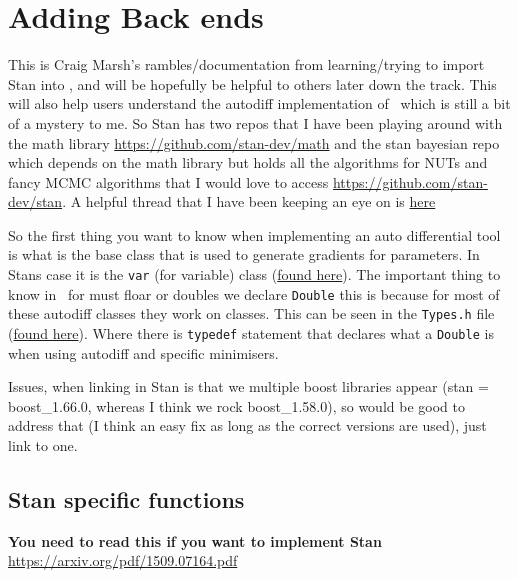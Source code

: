 \section{Adding Back ends\label{sec:Introduction}}
This is Craig Marsh's rambles/documentation from learning/trying to import Stan into \CNAME, and will be hopefully be helpful to others later down the track. This will also help users understand the autodiff implementation of \CNAME\ which is still a bit of a mystery to me. So Stan has two repos that I have been playing around with the math library \url{https://github.com/stan-dev/math} and the stan bayesian repo which depends on the math library but holds all the algorithms for NUTs and fancy MCMC algorithms that I would love to access \url{https://github.com/stan-dev/stan}. A helpful thread that I have been keeping an eye on is \href{https://discourse.mc-stan.org/t/use-stan-easily-from-c/2900/11}{here}


So the first thing you want to know when implementing an auto differential tool is what is the base class that is used to generate gradients for parameters. In Stans case it is the \texttt{var} (for variable) class (\href{https://github.com/stan-dev/math/blob/develop/stan/math/rev/core/var.hpp}{found here}). The important thing to know in \CNAME\ for must floar or doubles we declare \texttt{Double} this is because for most of these autodiff classes they work on classes. This can be seen in the \texttt{Types.h} file (\href{https://github.com/NIWAFisheriesModelling/CASAL2/blob/master/CASAL2/source/Utilities/Types.h}{found here}). Where there is \texttt{typedef} statement that declares what a \texttt{Double} is when using autodiff and specific minimisers. 


Issues, when linking in Stan is that we multiple boost libraries appear (stan = boost\_1.66.0, whereas I think we rock boost\_1.58.0), so would be good to address that (I think an easy fix as long as the correct versions are used), just link to one.

\subsection{Stan specific functions}
\textbf{You need to read this if you want to implement Stan} \url{https://arxiv.org/pdf/1509.07164.pdf}
